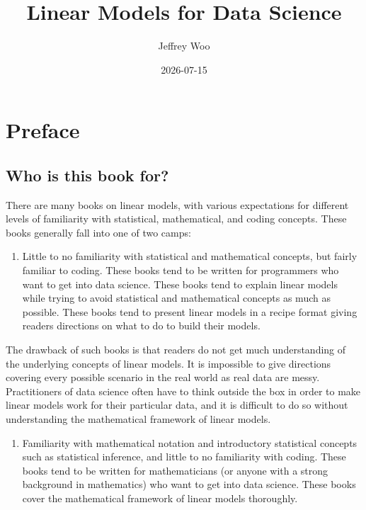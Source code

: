\documentclass[
]{book}
\title{Linear Models for Data Science}
\author{Jeffrey Woo}
\date{2026-07-15}
\providecommand{\tightlist}{%
  \setlength{\itemsep}{0pt}\setlength{\parskip}{0pt}}
\begin{document}
\maketitle

{
\setcounter{tocdepth}{1}
\tableofcontents
}
\hypertarget{preface}{%
\chapter*{Preface}\label{preface}}

\hypertarget{who-is-this-book-for}{%
\section*{Who is this book for?}\label{who-is-this-book-for}}

There are many books on linear models, with various expectations for different levels of familiarity with statistical, mathematical, and coding concepts. These books generally fall into one of two camps:

\begin{enumerate}
\def\labelenumi{\arabic{enumi}.}
\tightlist
\item
  Little to no familiarity with statistical and mathematical concepts, but fairly familiar to coding. These books tend to be written for programmers who want to get into data science. These books tend to explain linear models while trying to avoid statistical and mathematical concepts as much as possible. These books tend to present linear models in a recipe format giving readers directions on what to do to build their models.
\end{enumerate}

The drawback of such books is that readers do not get much understanding of the underlying concepts of linear models. It is impossible to give directions covering every possible scenario in the real world as real data are messy. Practitioners of data science often have to think outside the box in order to make linear models work for their particular data, and it is difficult to do so without understanding the mathematical framework of linear models.

\begin{enumerate}
\def\labelenumi{\arabic{enumi}.}
\setcounter{enumi}{1}
\tightlist
\item
  Familiarity with mathematical notation and introductory statistical concepts such as statistical inference, and little to no familiarity with coding. These books tend to be written for mathematicians (or anyone with a strong background in mathematics) who want to get into data science. These books cover the mathematical framework of linear models thoroughly.
\end{enumerate}
\end{document}
